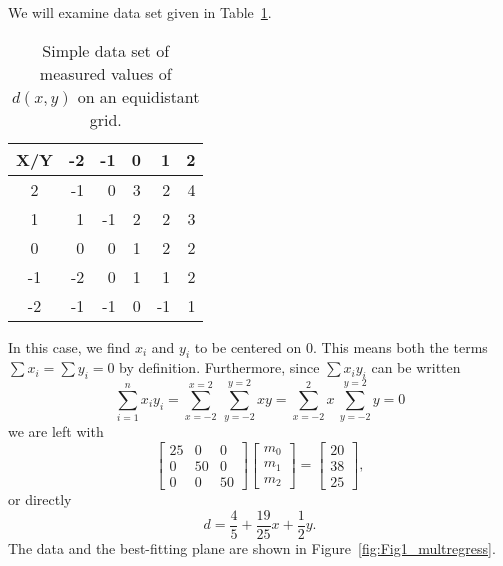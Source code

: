 \begin{example} 
We will examine data set given in Table~\ref{tbl:xy_grid}.
\begin{table}[H]
\center
\begin{tabular}{|c||r|r|r|r|r|} \hline
\bf{X/Y} & -2 & -1 & 0 & 1 & 2 \\ \hline \hline
2 & -1 & 0 & 3 & 2 & 4 \\ \hline
1 & 1 & -1 & 2 & 2 & 3 \\ \hline
0 & 0 & 0 & 1 & 2 & 2 \\ \hline
-1 & -2 & 0 & 1 & 1 & 2  \\ \hline
-2 & -1 & -1 & 0 & -1 & 1 \\ \hline
\end{tabular}
\caption{Simple data set of measured values of $d(x,y)$ on an equidistant grid.}
\label{tbl:xy_grid}
\end{table}
In this case, we find $x_i$ and $y_i$  to be centered on 0.  This means both the terms $\sum x_i = \sum y_i = 0$ by 
definition.  Furthermore, since $\sum {x_i y_i}$ can be written
\begin{equation}
\sum^n_{i=1} x_i y_i = \sum^{x=2}_{x=-2} \ \sum^{y=2}_{y=-2} x y = \sum ^2_{x = -2} x \  \sum^{y=2}_{y=-2} y = 0 
\end{equation}	 
we are left with
\begin{equation}
\left [ \begin{array}{rrr}
25 & 0 & 0 \\
0 & 50 & 0 \\
0 & 0 & 50 \end{array} \right ]
\left [ \begin{array}{c}
m_0\\ m_1\\ m_2 \end{array} \right ] = \left [ \begin{array}{c}
20 \\ 38 \\ 25 \end{array} \right ],
\end{equation}	 
or directly
\begin{equation}
d = \frac{4}{5} + \frac{19}{25}x + \frac{1}{2} y.
\label{eq:example_solution}
\end{equation}
The data and the best-fitting plane are shown in Figure~\ref{fig:Fig1_multregress}.
\end{example}
